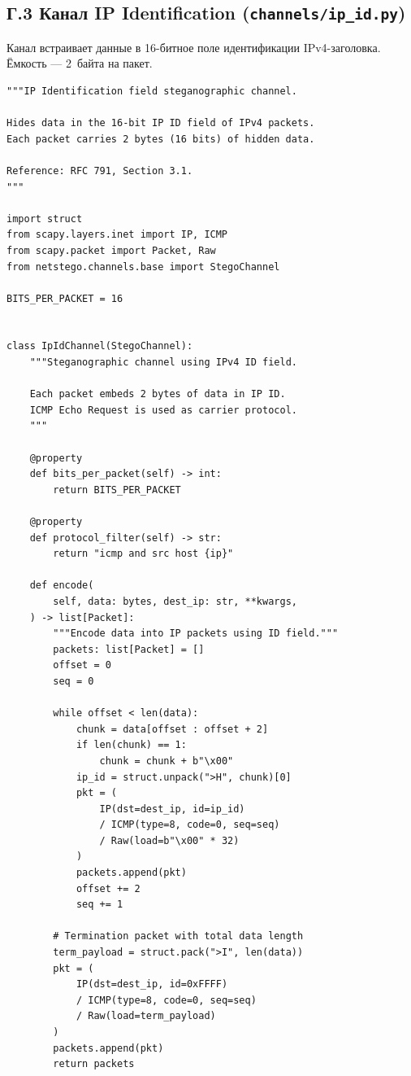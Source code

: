 \newpage
\subsection*{Г.3 Канал IP Identification (\texttt{channels/ip\_id.py})}

Канал встраивает данные в 16-битное поле идентификации IPv4-заголовка.
Ёмкость --- 2~байта на пакет.

\begin{lstlisting}[style=appendixcode]
"""IP Identification field steganographic channel.

Hides data in the 16-bit IP ID field of IPv4 packets.
Each packet carries 2 bytes (16 bits) of hidden data.

Reference: RFC 791, Section 3.1.
"""

import struct
from scapy.layers.inet import IP, ICMP
from scapy.packet import Packet, Raw
from netstego.channels.base import StegoChannel

BITS_PER_PACKET = 16


class IpIdChannel(StegoChannel):
    """Steganographic channel using IPv4 ID field.

    Each packet embeds 2 bytes of data in IP ID.
    ICMP Echo Request is used as carrier protocol.
    """

    @property
    def bits_per_packet(self) -> int:
        return BITS_PER_PACKET

    @property
    def protocol_filter(self) -> str:
        return "icmp and src host {ip}"

    def encode(
        self, data: bytes, dest_ip: str, **kwargs,
    ) -> list[Packet]:
        """Encode data into IP packets using ID field."""
        packets: list[Packet] = []
        offset = 0
        seq = 0

        while offset < len(data):
            chunk = data[offset : offset + 2]
            if len(chunk) == 1:
                chunk = chunk + b"\x00"
            ip_id = struct.unpack(">H", chunk)[0]
            pkt = (
                IP(dst=dest_ip, id=ip_id)
                / ICMP(type=8, code=0, seq=seq)
                / Raw(load=b"\x00" * 32)
            )
            packets.append(pkt)
            offset += 2
            seq += 1

        # Termination packet with total data length
        term_payload = struct.pack(">I", len(data))
        pkt = (
            IP(dst=dest_ip, id=0xFFFF)
            / ICMP(type=8, code=0, seq=seq)
            / Raw(load=term_payload)
        )
        packets.append(pkt)
        return packets


\end{lstlisting}
